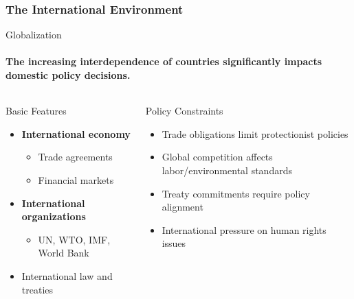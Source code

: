 \documentclass[10pt]{beamer}
\begin{document}
\begin{frame}
\frametitle{The International Environment}

\begin{block}{Globalization}
\framesubtitle{The increasing interdependence of countries significantly impacts domestic policy decisions.}
\end{block}

\vspace{0.5cm}

\begin{columns}
\begin{column}{0.48\textwidth}
\begin{block}{Basic Features}
\pause
\begin{itemize}
\item \textbf{International economy}
\begin{itemize}
\item Trade agreements
\item Financial markets
\end{itemize}
\item \textbf{International organizations}
\begin{itemize}
\item UN, WTO, IMF, World Bank
\end{itemize}
\item International law and treaties
\end{itemize}
\end{block}
\end{column}

\begin{column}{0.48\textwidth}
\begin{block}{Policy Constraints}
\pause
\begin{itemize}
\item Trade obligations limit protectionist policies
\item Global competition affects labor/environmental standards
\item Treaty commitments require policy alignment
\item International pressure on human rights issues
\end{itemize}
\end{block}
\end{column}
\end{columns}

\end{frame}
\end{document}
